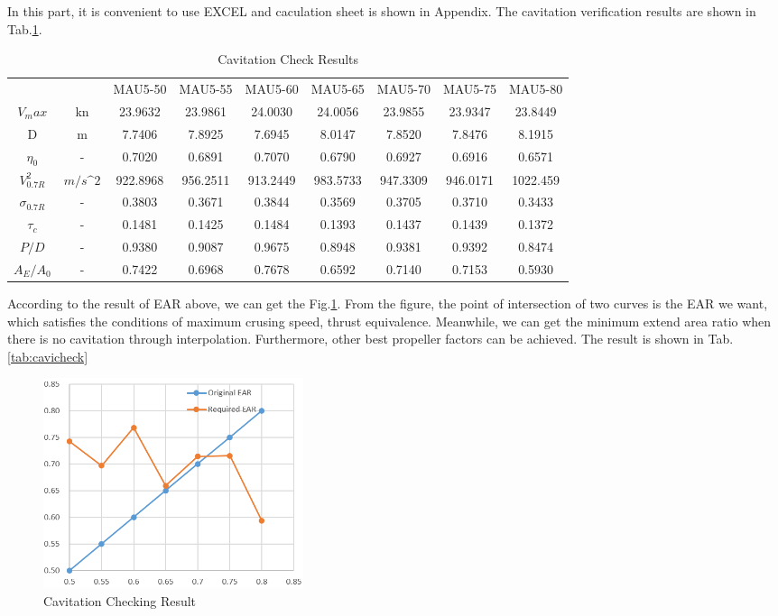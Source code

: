 \documentclass[a4paper,UTF8]{article}
\begin{document}
In this part, it is convenient to use EXCEL and caculation sheet is shown in Appendix. The cavitation verification results are shown in Tab.\ref{tab:cavitation}.
\begin{table}[!htbp]
	\centering
	\begin{tabular}{ccccccccc}
		\hline
		&       & \multicolumn{1}{l}{MAU5-50} & \multicolumn{1}{l}{MAU5-55} & \multicolumn{1}{l}{MAU5-60} & \multicolumn{1}{l}{MAU5-65} & \multicolumn{1}{l}{MAU5-70} & \multicolumn{1}{l}{MAU5-75} & \multicolumn{1}{l}{MAU5-80} \\
		$V_max$  & kn    & 23.9632  & 23.9861  & 24.0030  & 24.0056  & 23.9855  & 23.9347  & 23.8449  \\
		D & m     & 7.7406  & 7.8925  & 7.6945  & 8.0147  & 7.8520  & 7.8476  & 8.1915  \\
		$\eta_0$ & -     & 0.7020  & 0.6891  & 0.7070  & 0.6790  & 0.6927  & 0.6916  & 0.6571  \\
		$V^2_{0.7R}$ & $m/s\^2$ & 922.8968 & 956.2511 & 913.2449 & 983.5733 & 947.3309 & 946.0171 & 1022.459 \\
		$\sigma_{0.7R}$  & -     & 0.3803  & 0.3671  & 0.3844  & 0.3569  & 0.3705  & 0.3710  & 0.3433  \\
		$\tau_c$ & -     & 0.1481 & 0.1425 & 0.1484 & 0.1393 & 0.1437 & 0.1439 & 0.1372 \\
		$P/D$ & -     & 0.9380  & 0.9087  & 0.9675  & 0.8948  & 0.9381  & 0.9392  & 0.8474  \\
		$A_E/A_0$ & -     & 0.7422  & 0.6968  & 0.7678  & 0.6592  & 0.7140  & 0.7153  & 0.5930  \\
		\hline
	\end{tabular}
	\caption{Cavitation Check Results}
	\label{tab:cavitation}
\end{table}
According to the result of EAR above, we can get the Fig.\ref{fig:cavitation}. From the figure, the point of intersection of two curves is the EAR we want, which satisfies the conditions of maximum crusing speed, thrust equivalence. Meanwhile, we can get the minimum extend area ratio when there is no cavitation through interpolation. Furthermore, other best propeller factors can be achieved. The result is shown in Tab.\ref{tab:cavicheck}
\begin{figure}
	\centering
	\includegraphics[width=3in]{figure/cavitation_check.png}
	\caption{Cavitation Checking Result}
	\label{fig:cavitation}
\end{figure}
\end{document}

